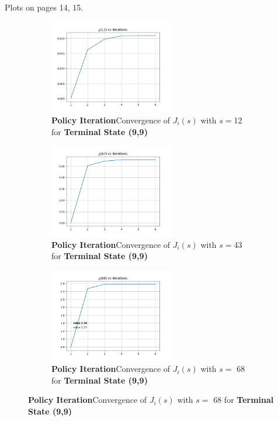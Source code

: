 Plots on pages 14, 15.

\begin{figure}[h]
\begin{subfigure}
\centering
\includegraphics[angle=0,width=0.6\textwidth]{hw4/logs/policy_iter_t=99_N=20/convergence-till-6-state-12.png}
\caption{ \textbf{Policy Iteration}Convergence of $J_i(s)$ with $s =$12 for \textbf{Terminal State (9,9)}}
\end{subfigure}

\begin{subfigure}
\centering
\includegraphics[angle=0,width=0.6\textwidth]{hw4/logs/policy_iter_t=99_N=20/convergence-till-6-state-43.png}
\caption{ \textbf{Policy Iteration}Convergence of $J_i(s)$ with $s =$43 for \textbf{Terminal State (9,9)}}
\end{subfigure}

\begin{subfigure}
\centering
\includegraphics[angle=0,width=0.6\textwidth]{hw4/logs/policy_iter_t=99_N=20/convergence-till-6-state-68.png}
\caption{ \textbf{Policy Iteration}Convergence of $J_i(s)$ with $s =$ 68 for \textbf{Terminal State (9,9)}}
\end{subfigure}
\end{figure}

